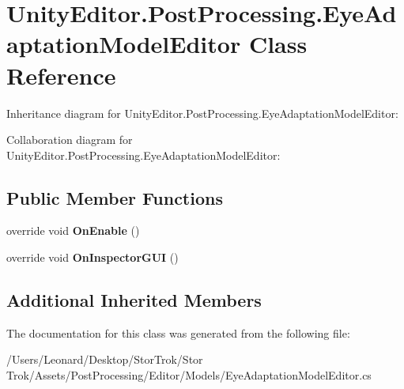 \hypertarget{class_unity_editor_1_1_post_processing_1_1_eye_adaptation_model_editor}{}\section{Unity\+Editor.\+Post\+Processing.\+Eye\+Adaptation\+Model\+Editor Class Reference}
\label{class_unity_editor_1_1_post_processing_1_1_eye_adaptation_model_editor}


Inheritance diagram for Unity\+Editor.\+Post\+Processing.\+Eye\+Adaptation\+Model\+Editor\+:


Collaboration diagram for Unity\+Editor.\+Post\+Processing.\+Eye\+Adaptation\+Model\+Editor\+:
\subsection*{Public Member Functions}
\begin{DoxyCompactItemize}
\item 
\mbox{\label{class_unity_editor_1_1_post_processing_1_1_eye_adaptation_model_editor_a9d480e9449494f870ac0ce711fce6091}} 
override void {\bfseries On\+Enable} ()
\item 
\mbox{\label{class_unity_editor_1_1_post_processing_1_1_eye_adaptation_model_editor_a4cf6a60dd7701b19aeda57e557f44cee}} 
override void {\bfseries On\+Inspector\+G\+UI} ()
\end{DoxyCompactItemize}
\subsection*{Additional Inherited Members}


The documentation for this class was generated from the following file\+:\begin{DoxyCompactItemize}
\item 
/\+Users/\+Leonard/\+Desktop/\+Stor\+Trok/\+Stor Trok/\+Assets/\+Post\+Processing/\+Editor/\+Models/Eye\+Adaptation\+Model\+Editor.\+cs\end{DoxyCompactItemize}
